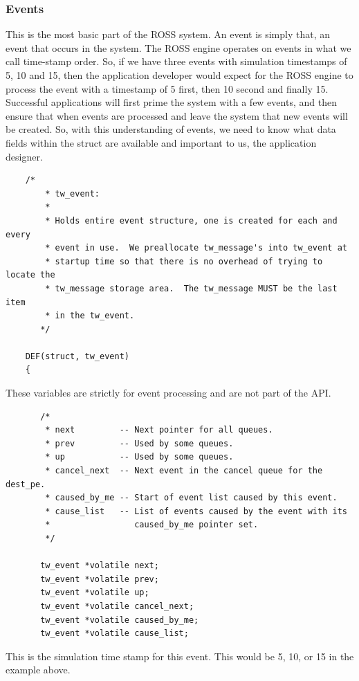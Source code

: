 \documentclass[12pt]{article}
\begin{document}
\subsubsection{Events}
This is the most basic part of the ROSS system.  An event is simply that, an
event that occurs in the system.  The ROSS engine operates on events in what
we call time-stamp order.  So, if we have three events with simulation
timestamps of 5, 10 and 15, then the application developer would expect for
the ROSS engine to process the event with a timestamp of 5 first, then 10
second and finally 15.  Successful applications will first prime the system
with a few events, and then ensure that when events are processed and leave
the system that new events will be created.  So, with this understanding of
events, we need to know what data fields within the struct are available and
important to us, the application designer.

\begin{verbatim}
	/*
        * tw_event:
        *
        * Holds entire event structure, one is created for each and every
        * event in use.  We preallocate tw_message's into tw_event at
        * startup time so that there is no overhead of trying to locate the
        * tw_message storage area.  The tw_message MUST be the last item
        * in the tw_event.
       */

	DEF(struct, tw_event)
	{
\end{verbatim}

These variables are strictly for event processing and are not part of
the API.

\begin{verbatim}
       /*
        * next         -- Next pointer for all queues.
        * prev         -- Used by some queues.
        * up           -- Used by some queues.
        * cancel_next  -- Next event in the cancel queue for the dest_pe.
        * caused_by_me -- Start of event list caused by this event.
        * cause_list   -- List of events caused by the event with its
        *                 caused_by_me pointer set.
        */

       tw_event *volatile next;
       tw_event *volatile prev;
       tw_event *volatile up;
       tw_event *volatile cancel_next;
       tw_event *volatile caused_by_me;
       tw_event *volatile cause_list;
\end{verbatim}

This is the simulation time stamp for this event.  This would be 5,
10, or 15 in the example above.
\end{document}
